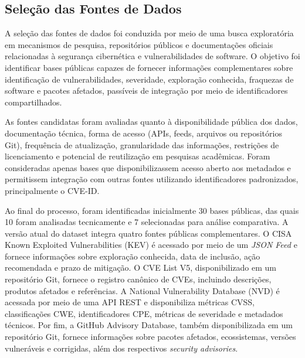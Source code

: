 \subsection{Seleção das Fontes de Dados}

A seleção das fontes de dados foi conduzida por meio de uma busca exploratória em mecanismos de pesquisa, repositórios públicos e documentações oficiais relacionadas à segurança cibernética e vulnerabilidades de software. O objetivo foi identificar bases públicas capazes de fornecer informações complementares sobre identificação de vulnerabilidades, severidade, exploração conhecida, fraquezas de software e pacotes afetados, passíveis de integração por meio de identificadores compartilhados.

As fontes candidatas foram avaliadas quanto à disponibilidade pública dos dados, documentação técnica, forma de acesso (APIs, feeds, arquivos ou repositórios Git), frequência de atualização, granularidade das informações, restrições de licenciamento e potencial de reutilização em pesquisas acadêmicas. Foram consideradas apenas bases que disponibilizassem acesso aberto aos metadados e permitissem integração com outras fontes utilizando identificadores padronizados, principalmente o CVE-ID.

Ao final do processo, foram identificadas inicialmente 30 bases públicas, das quais 10 foram analisadas tecnicamente e 7 selecionadas para análise comparativa. A versão atual do dataset integra quatro fontes públicas complementares. O CISA Known Exploited Vulnerabilities (KEV) é acessado por meio de um \textit{JSON Feed} e fornece informações sobre exploração conhecida, data de inclusão, ação recomendada e prazo de mitigação. O CVE List V5, disponibilizado em um repositório Git, fornece o registro canônico de CVEs, incluindo descrições, produtos afetados e referências. A National Vulnerability Database (NVD) é acessada por meio de uma API REST e disponibiliza métricas CVSS, classificações CWE, identificadores CPE, métricas de severidade e metadados técnicos. Por fim, a GitHub Advisory Database, também disponibilizada em um repositório Git, fornece informações sobre pacotes afetados, ecossistemas, versões vulneráveis e corrigidas, além dos respectivos \textit{security advisories}.
